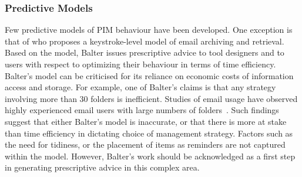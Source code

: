 \subsubsection{Predictive Models}
\label{review:theory-pimmodels-predictive}
Few predictive models of PIM behaviour have been developed.  One exception is that of \citet{ob:00} who proposes a keystroke-level model of email archiving and retrieval.  Based on the model, Balter issues prescriptive advice to tool designers and to users with respect to optimizing their behaviour in terms of time efficiency.  Balter's model can be criticised for its reliance on economic costs of information access and storage.  For example, one of Balter's claims is that any strategy involving more than 30 folders is inefficient.  Studies of email usage have observed highly experienced email users with large numbers of folders~\citep{Ducheneaut:01}.  Such findings suggest that either Balter's model is inaccurate, or that there is more at stake than time efficiency in dictating choice of management strategy.  Factors such as the need for tidiness, or the placement of items as reminders are not captured within the model.  However, Balter's work should be acknowledged as a first step in generating prescriptive advice in this complex area.



